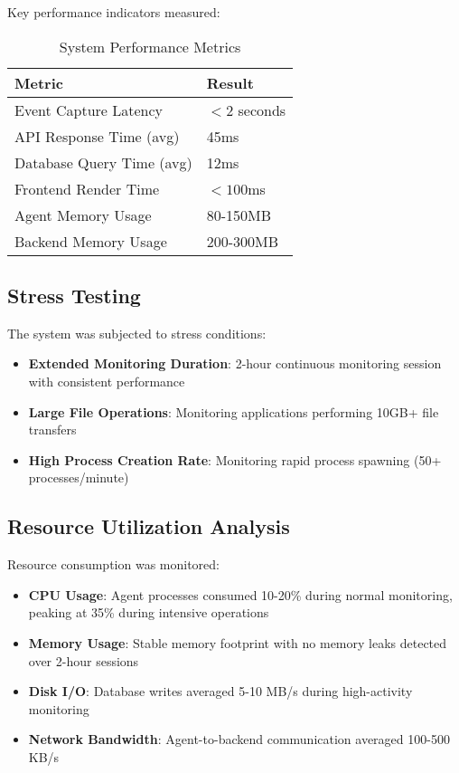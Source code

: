 Key performance indicators measured:

\begin{table}[h]
\centering
\begin{tabular}{|l|l|}
\hline
\textbf{Metric} & \textbf{Result} \\
\hline
Event Capture Latency & $< 2$ seconds \\
API Response Time (avg) & 45ms \\
Database Query Time (avg) & 12ms \\
Frontend Render Time & $< 100$ms \\
Agent Memory Usage & 80-150MB \\
Backend Memory Usage & 200-300MB \\
\hline
\end{tabular}
\caption{System Performance Metrics}
\end{table}

\subsection{Stress Testing}

The system was subjected to stress conditions:

\begin{itemize}
    \item \textbf{Extended Monitoring Duration}: 2-hour continuous monitoring session with consistent performance
    \item \textbf{Large File Operations}: Monitoring applications performing 10GB+ file transfers
    \item \textbf{High Process Creation Rate}: Monitoring rapid process spawning (50+ processes/minute)
\end{itemize}

\subsection{Resource Utilization Analysis}

Resource consumption was monitored:

\begin{itemize}
    \item \textbf{CPU Usage}: Agent processes consumed 10-20\% during normal monitoring, peaking at 35\% during intensive operations
    \item \textbf{Memory Usage}: Stable memory footprint with no memory leaks detected over 2-hour sessions
    \item \textbf{Disk I/O}: Database writes averaged 5-10 MB/s during high-activity monitoring
    \item \textbf{Network Bandwidth}: Agent-to-backend communication averaged 100-500 KB/s
\end{itemize}

